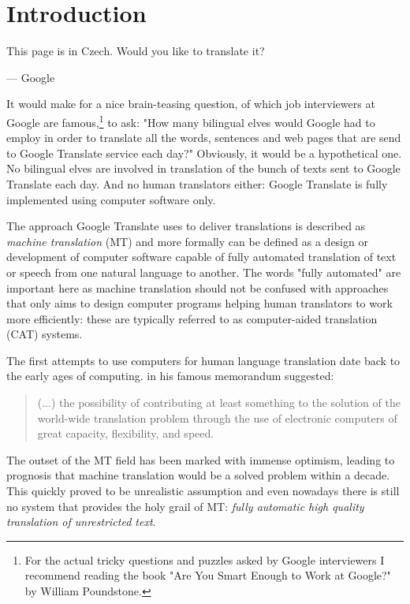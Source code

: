 \chapter{Introduction}
\label{chap:introduction}

\setlength{\epigraphwidth}{1.0\textwidth}
\epigraph{This page is in Czech. Would you like to translate it?}{--- Google}

It would make for a nice brain-teasing question, of which job interviewers
at Google are famous,\footnote{For the actual tricky questions and puzzles
asked by Google interviewers I recommend reading the book "Are You Smart
Enough to Work at Google?" by William Poundstone.} to ask:
"How many bilingual elves would Google had to employ in order to translate
all the words, sentences and web pages that are send to Google Translate
service each day?"
Obviously, it would be a hypothetical one. No bilingual elves are involved
in translation of the bunch of texts sent to Google Translate each day.
And no human translators either: Google Translate is fully implemented using
computer software only.

The approach Google Translate uses to deliver translations is described as
\emph{machine translation} (MT) and more formally can be defined as a design
or development of computer software capable of fully automated translation
of text or speech from one natural language to another.
The words "fully automated" are important here as machine translation should
not be confused with approaches that only aims to design computer programs
helping human translators to work more efficiently: these are typically
referred to as computer-aided translation (CAT) systems.

The first attempts to use computers for human language translation date
back to the early ages of computing. \citet{weaver:memorandum} in his famous
memorandum suggested:
\begin{quote}
(...) the possibility of contributing at least
something to the solution of the world-wide translation problem through the use
of electronic computers of great capacity, flexibility, and speed.
\end{quote}
The outset of the MT field has been marked with immense optimism, leading
to prognosis that machine translation would be a solved problem within
a decade. %
This quickly proved to be unrealistic assumption and even nowadays
there is still no system that provides the holy grail of MT:
\emph{fully automatic high quality translation of unrestricted text}.

